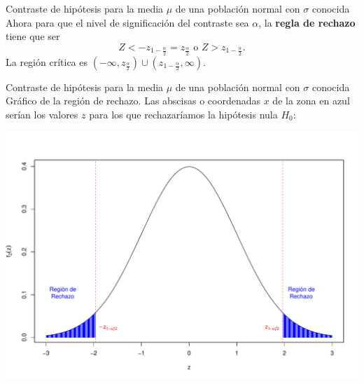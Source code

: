 \documentclass[
  ignorenonframetext,
]{beamer}
\begin{document}
\begin{frame}{Contraste de hipótesis para la media \(\mu\) de una
población normal con \(\sigma\) conocida}
\protect\hypertarget{contraste-de-hipuxf3tesis-para-la-media-mu-de-una-poblaciuxf3n-normal-con-sigma-conocida-2}{}
Ahora para que el nivel de significación del contraste sea \(\alpha\),
la \textbf{regla de rechazo} tiene que ser \[
Z<-z_{1-\frac{\alpha}2}=z_{\frac{\alpha}2}\mbox{ o }Z>z_{1-\frac{\alpha}2}.
\] La región crítica es
\((-\infty,z_{\frac\alpha2})\cup (z_{1-\frac{\alpha}2},\infty).\)
\end{frame}

\begin{frame}{Contraste de hipótesis para la media \(\mu\) de una
población normal con \(\sigma\) conocida}
\protect\hypertarget{contraste-de-hipuxf3tesis-para-la-media-mu-de-una-poblaciuxf3n-normal-con-sigma-conocida-3}{}
Gráfico de la región de rechazo. Las abscisas o coordenadas \(x\) de la
zona en azul serían los valores \(z\) para los que rechazaríamos la
hipótesis nula \(H_0\):

\begin{center}\includegraphics{contrastes_dos_muestras_files/figure-beamer/unnamed-chunk-3-1} \end{center}
\end{frame}
\end{document}
